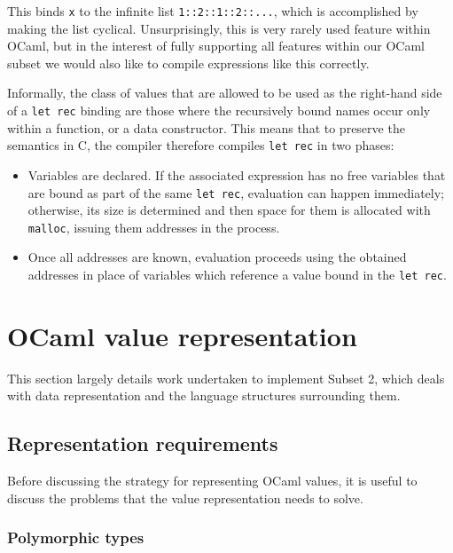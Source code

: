 This binds \texttt{x} to the infinite list \texttt{1::2::1::2::...}, which is
accomplished by making the list cyclical. Unsurprisingly, this is very rarely
used feature within OCaml, but in the interest of fully supporting all features
within our OCaml subset we would also like to compile expressions like this
correctly.

Informally, the class of values that are allowed to be used as the right-hand
side of a \texttt{let rec} binding are those where the recursively bound names
occur only within a function, or a data constructor. This means that to preserve
the semantics in C, the compiler therefore compiles \texttt{let rec} in two
phases:

\begin{itemize} 
    
\item Variables are declared. If the associated expression has no free variables
    that are bound as part of the same \texttt{let rec}, evaluation can happen
    immediately; otherwise, its size is determined and then space for them is
    allocated with \texttt{malloc}, issuing them addresses in the process.        

\item Once all addresses are known, evaluation proceeds using the obtained
    addresses in place of variables which reference a value bound in the
    \texttt{let rec}.

\end{itemize}

\section{OCaml value representation}\label{value-repr}

This section largely details work undertaken to implement Subset 2, which deals 
with data representation and the language structures surrounding them.

\subsection{Representation requirements}

Before discussing the strategy for representing OCaml values, it is useful to
discuss the problems that the value representation needs to solve.

\subsubsection{Polymorphic types}

